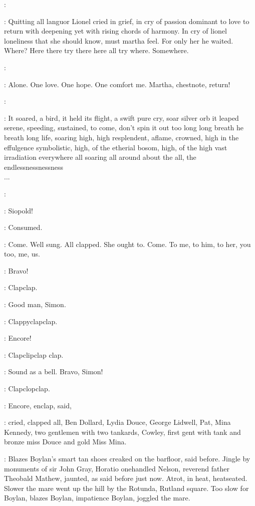 \simon:

\BloomInt:
Quitting all languor Lionel cried in grief,
in cry of passion dominant
to love to return with deepening yet with rising chords of harmony.
In cry
of lionel loneliness that she should know,
must martha feel.
For only her
he waited.
Where?
Here there try there here all try where.
Somewhere.

\simon:

\BloomInt:
Alone.
One love.
One hope.
One comfort me.
Martha,
chestnote,
return!

\simon:

:
It soared,
a bird,
it held its flight,
a swift pure cry,
soar silver orb
it leaped serene,
speeding,
sustained,
to come,
don't spin it out too long
long breath he breath long life,
soaring high,
high resplendent,
aflame,
crowned,
high in the effulgence symbolistic,
high,
of the etherial bosom,
high,
of the high vast irradiation everywhere all soaring all around about
the all,
the endlessnessnessness%
\\
...

\simon:

\BloomInt:
Siopold!

\BloomInt:
Consumed.

\BloomInt:
Come.
Well sung.
All clapped.
She ought to.
Come.
To me,
to him,
to
her,
you too,
me,
us.

\lenehan:
Bravo!

:
Clapclap.

\dollard:
Good man,
Simon.

:
Clappyclapclap.

\cowley:
Encore!

:
Clapclipclap clap.

\lenehan:
Sound as a bell.
Bravo,
Simon!

:
Clapclopclap.

:
Encore,
enclap,
said,

:
cried,
clapped all,
Ben Dollard,
Lydia Douce,
George
Lidwell,
Pat,
Mina Kennedy,
two gentlemen with two tankards,
Cowley,
first gent with tank and bronze miss Douce
and gold Miss Mina.

:
Blazes Boylan's smart tan shoes creaked on the barfloor,
said before.
Jingle by monuments of sir John Gray,
Horatio onehandled Nelson,
reverend father Theobald Mathew,
jaunted,
as said before just now.
Atrot,
in heat,
heatseated.
Slower the mare
went up the hill by the Rotunda,
Rutland square.
Too slow for Boylan,
blazes Boylan,
impatience Boylan,
joggled the mare.

